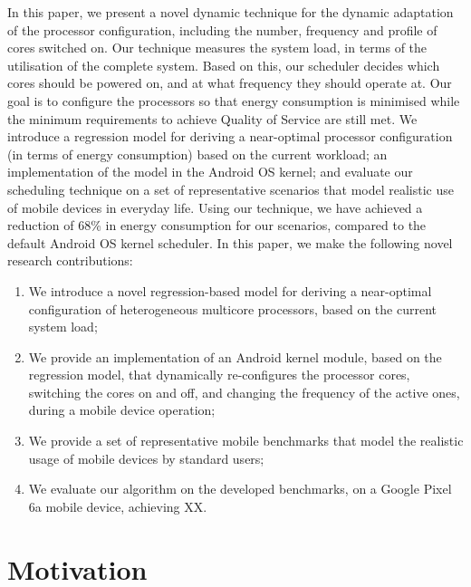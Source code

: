 \documentclass[conference]{IEEEtran}
\begin{document}
In this paper, we present a novel dynamic technique for the dynamic adaptation of the processor configuration, including the number, frequency and profile of cores switched on. Our technique measures the system load, in terms of the utilisation of the complete system. Based on this, our scheduler decides which cores should be powered on, and at what frequency they should operate at. Our goal is to configure the processors so that energy consumption is minimised while the minimum requirements to achieve Quality of Service are still met. We introduce a regression model for deriving a near-optimal processor configuration (in terms of energy consumption) based on the current workload; an implementation of the model in the Android OS kernel; and evaluate our scheduling technique on a set of representative scenarios that model realistic use of mobile devices in everyday life. Using our technique, we have achieved a reduction of 68\% in energy consumption for our scenarios, compared to the default Android OS kernel scheduler. 
%
In this paper, we make the following novel research contributions:
\begin{enumerate}
\item We introduce a novel regression-based model for deriving a near-optimal configuration of heterogeneous multicore processors, based on the current system load;
\item We provide an implementation of an Android kernel module, based on the regression model, that dynamically re-configures the processor cores, switching the cores on and off, and changing the frequency of the active ones, during a mobile device operation;
\item We provide a set of representative mobile benchmarks that model the realistic usage of mobile devices by standard users;
\item We evaluate our algorithm on the developed benchmarks, on a Google Pixel 6a mobile device, achieving XX.
\end{enumerate}

\section{Motivation}
\label{sec:motivation}
\end{document}
